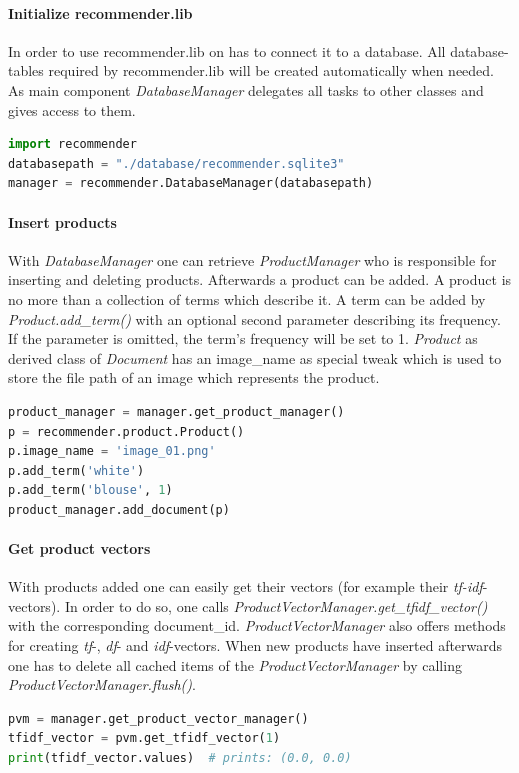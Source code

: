 \paragraph{Initialize recommender.lib}
In order to use recommender.lib on has to connect it to a database.
All database-tables required by recommender.lib will be created automatically when needed.
As main component \textit{DatabaseManager} delegates all tasks to other classes and gives access to them.
\begin{lstlisting}[language=Python,caption={Startup of recommender.lib},label={lst:recommenderlib-startup}]
import recommender
databasepath = "./database/recommender.sqlite3"
manager = recommender.DatabaseManager(databasepath)
\end{lstlisting}

\paragraph{Insert products}
With \textit{DatabaseManager} one can retrieve \textit{ProductManager} who is responsible for inserting and deleting products.
Afterwards a product can be added.
A product is no more than a collection of terms which describe it.
A term can be added by \textit{Product.add\_term()} with an optional second parameter describing its frequency.
If the parameter is omitted, the term's frequency will be set to 1.
\textit{Product} as derived class of \textit{Document} has an image\_name as special tweak which is used to store the file path of an image which represents the product.
\begin{lstlisting}[language=Python,caption={Insertion of products},label={lst:recommenderlib-product-insertion}]
product_manager = manager.get_product_manager()
p = recommender.product.Product()
p.image_name = 'image_01.png'
p.add_term('white')
p.add_term('blouse', 1)
product_manager.add_document(p)
\end{lstlisting}

\paragraph{Get product vectors}
With products added one can easily get their vectors (for example their \textit{tf-idf}-vectors).
In order to do so, one calls \textit{ProductVectorManager.get\_tfidf\_vector()} with the corresponding document\_id.
\textit{ProductVectorManager} also offers methods for creating \textit{tf}-, \textit{df}- and \textit{idf}-vectors.
When new products have inserted afterwards one has to delete all cached items of the \textit{ProductVectorManager} by calling \textit{ProductVectorManager.flush()}.
\begin{lstlisting}[language=Python,caption={\textit{tf-idf} vector of a product},label={lst:recommenderlib-product-vector}]
pvm = manager.get_product_vector_manager()
tfidf_vector = pvm.get_tfidf_vector(1)
print(tfidf_vector.values)  # prints: (0.0, 0.0)
\end{lstlisting}


